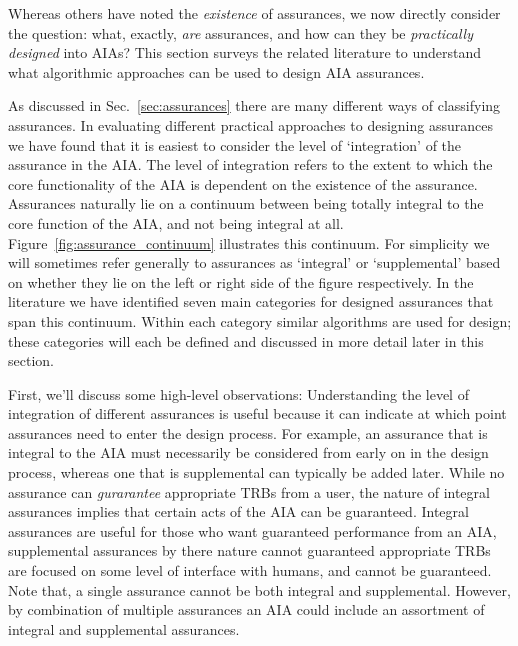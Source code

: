     Whereas others have noted the \textit{existence} of assurances, we now directly consider the question: what, exactly, \textit{are} assurances, and how can they be \textit{practically designed} into AIAs? 
    This section surveys the related literature to understand what algorithmic approaches can be used to design AIA assurances. 
    
    As discussed in Sec.~\ref{sec:assurances} there are many different ways of classifying assurances. In evaluating different practical approaches to designing assurances we have found that it is easiest to consider the level of `integration' of the assurance in the AIA. The level of integration refers to the extent to which the core functionality of the AIA is dependent on the existence of the assurance. Assurances naturally lie on a continuum between being totally integral to the core function of the AIA, and not being integral at all. Figure~\ref{fig:assurance_continuum} illustrates this continuum. For simplicity we will sometimes refer generally to assurances as `integral' or `supplemental' based on whether they lie on the left or right side of the figure respectively. In the literature we have identified seven main categories for designed assurances that span this continuum. Within each category similar algorithms are used for design; these categories will each be defined and discussed in more detail later in this section.
    
    First, we'll discuss some high-level observations: 
    Understanding the level of integration of different assurances is useful because it can indicate at which point assurances need to enter the design process. For example, an assurance that is integral to the AIA must necessarily be considered from early on in the design process, whereas one that is supplemental can typically be added later.
    While no assurance can \emph{gurarantee} appropriate TRBs from a user, the nature of integral assurances implies that certain acts of the AIA can be guaranteed.
    Integral assurances are useful for those who want guaranteed performance from an AIA, supplemental assurances by there nature cannot guaranteed appropriate TRBs are focused on some level of interface with humans, and cannot be guaranteed.
    Note that, a single assurance cannot be both integral and supplemental. However, by combination of multiple assurances an AIA could include an assortment of integral and supplemental assurances.

